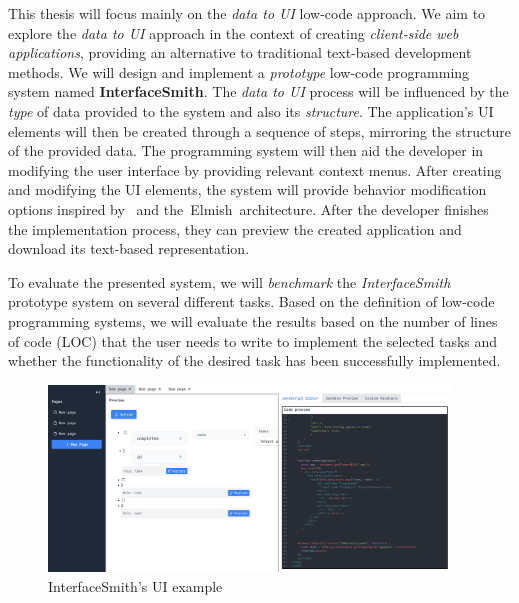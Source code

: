 This thesis will focus mainly on the \emph{data to UI} low-code approach.
We aim to explore the \emph{data to UI} approach in the context of creating \emph{client-side web applications}, providing an alternative to traditional text-based development methods.
We will design and implement a \emph{prototype} low-code programming system named \textbf{InterfaceSmith}.
The \emph{data to UI} process will be influenced by the \emph{type} of data provided to the system and also its \emph{structure}.
The application's UI elements will then be created through a sequence of steps, mirroring the structure of the provided data.
The programming system will then aid the developer in modifying the user interface by providing relevant context menus.
After creating and modifying the UI elements, the system will provide behavior modification options inspired by~\citet{eml} and the~Elmish~architecture\cite{elmish}.
After the developer finishes the implementation process, they can preview the created application and download its text-based representation.

To evaluate the presented system, we will \emph{benchmark} the \emph{InterfaceSmith} prototype system on several different tasks.
Based on the definition of low-code programming systems, we will evaluate the results based on the number of lines of code (LOC) that the user needs to write to implement the selected tasks and whether the functionality of the desired task has been successfully implemented.

\begin{figure}[htbp]
	\begin{center}
		\includegraphics[width=0.95\textwidth]{img/UIExample.pdf}
	\end{center}
	\caption{InterfaceSmith's UI example }
	\label{fig:prototype-teaser}
\end{figure}

